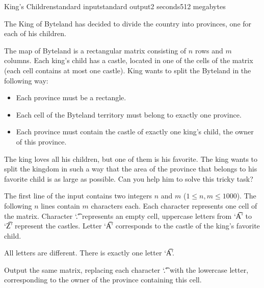 \begin{problem}{King's Children}{standard input}{standard output}{2 seconds}{512 megabytes}

The King of Byteland has decided to divide the country into provinces, one for each of his children.

The map of Byteland is a rectangular matrix consisting of $n$ rows and $m$ columns. Each king's child has a castle, located in one of the cells of the matrix (each cell contains at most one castle). King wants to split the Byteland in the following way:
\begin{itemize}
\item Each province must be a rectangle.
\item Each cell of the Byteland territory must belong to exactly one province.
\item Each province must contain the castle of exactly one king's child, the owner of this province.
\end{itemize}

The king loves all his children, but one of them is his favorite. The king wants to split the kingdom in such a way that the area of the province that belongs to his favorite child is as large as possible. Can you help him to solve this tricky task?

\InputFile
The first line of the input contains two integers $n$ and $m$ ($1\le n, m\le 1000$). The following $n$ lines contain $m$ characters each. Each character represents one cell of the matrix. Character  `\t{.}' represents an empty cell, uppercase letters from `\t{A}' to `\t{Z}' represent the castles. Letter `\t{A}' corresponds to the castle of the king's favorite child. 

All letters are different. There is exactly one letter `\t{A}'.

\OutputFile
Output the same matrix, replacing each character `\t{.}' with the lowercase letter, corresponding to the owner of the province containing this cell.

\Example

\begin{example}
%
\end{example}

\end{problem}

